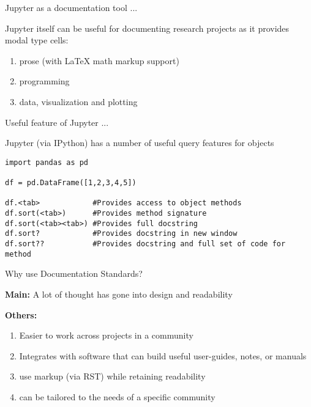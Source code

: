 \documentclass{beamer}
\begin{document}
\begin{frame}{Jupyter as a documentation tool ...}

Jupyter itself can be useful for documenting research projects as it provides modal type cells:

\begin{enumerate}
  \item prose (with LaTeX math markup support)
  \item programming
  \item data, visualization and plotting
\end{enumerate}

\end{frame}

\begin{frame}[fragile]{Useful feature of Jupyter ...}

Jupyter (via IPython) has a number of useful query features for objects

\begin{verbatim}
import pandas as pd 

df = pd.DataFrame([1,2,3,4,5])

df.<tab>            #Provides access to object methods
df.sort(<tab>)      #Provides method signature
df.sort(<tab><tab>) #Provides full docstring
df.sort?            #Provides docstring in new window
df.sort??           #Provides docstring and full set of code for method
\end{verbatim}

\end{frame}


\begin{frame}{Why use Documentation Standards?}

\textbf{Main:} A lot of thought has gone into design and readability

\textbf{Others:}

\begin{enumerate}
  \item Easier to work across projects in a community
  \item Integrates with software that can build useful user-guides, notes, or manuals
  \item use markup (via RST) while retaining readability
  \item can be tailored to the needs of a specific community
\end{enumerate}

\end{frame}
\end{document}
